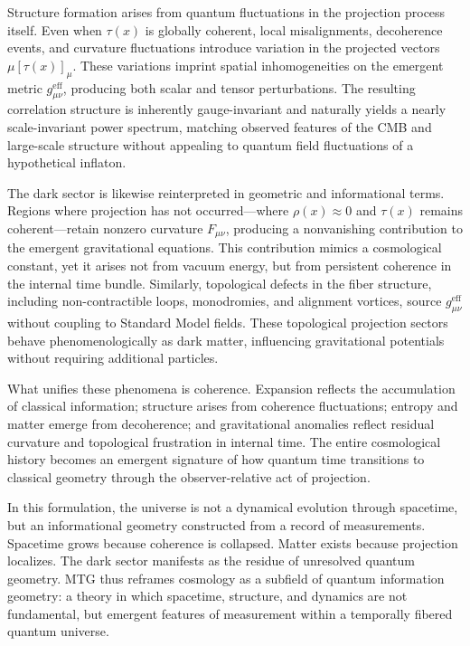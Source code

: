 \documentclass[11pt]{article}
\begin{document}
Structure formation arises from quantum fluctuations in the projection process itself. Even when \( \tau(x) \) is globally coherent, local misalignments, decoherence events, and curvature fluctuations introduce variation in the projected vectors \( \mu[\tau(x)]_\mu \). These variations imprint spatial inhomogeneities on the emergent metric \( g^{\mathrm{eff}}_{\mu\nu} \), producing both scalar and tensor perturbations. The resulting correlation structure is inherently gauge-invariant and naturally yields a nearly scale-invariant power spectrum, matching observed features of the CMB and large-scale structure without appealing to quantum field fluctuations of a hypothetical inflaton.

The dark sector is likewise reinterpreted in geometric and informational terms. Regions where projection has not occurred---where \( \rho(x) \approx 0 \) and \( \tau(x) \) remains coherent---retain nonzero curvature \( F_{\mu\nu} \), producing a nonvanishing contribution to the emergent gravitational equations. This contribution mimics a cosmological constant, yet it arises not from vacuum energy, but from persistent coherence in the internal time bundle. Similarly, topological defects in the fiber structure, including non-contractible loops, monodromies, and alignment vortices, source \( g^{\mathrm{eff}}_{\mu\nu} \) without coupling to Standard Model fields. These topological projection sectors behave phenomenologically as dark matter, influencing gravitational potentials without requiring additional particles.

What unifies these phenomena is coherence. Expansion reflects the accumulation of classical information; structure arises from coherence fluctuations; entropy and matter emerge from decoherence; and gravitational anomalies reflect residual curvature and topological frustration in internal time. The entire cosmological history becomes an emergent signature of how quantum time transitions to classical geometry through the observer-relative act of projection.

In this formulation, the universe is not a dynamical evolution through spacetime, but an informational geometry constructed from a record of measurements. Spacetime grows because coherence is collapsed. Matter exists because projection localizes. The dark sector manifests as the residue of unresolved quantum geometry. MTG thus reframes cosmology as a subfield of quantum information geometry: a theory in which spacetime, structure, and dynamics are not fundamental, but emergent features of measurement within a temporally fibered quantum universe.
\end{document}
